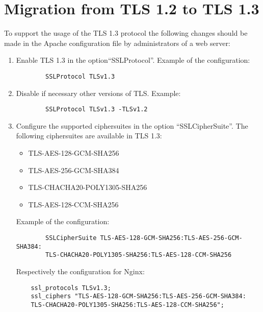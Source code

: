 \chapter{Migration from TLS 1.2 to TLS 1.3}
\label{chap:migration}

To support the usage of the TLS 1.3 protocol the following changes should be made in the Apache configuration file by administrators of a web server:\\
\begin{enumerate}
	\item Enable TLS 1.3 in the option“SSLProtocol”. Example of the configuration:
    \begin{verbatim}
        SSLProtocol TLSv1.3
    \end{verbatim}
    \item Disable if necessary other versions of TLS. Example: 
    \begin{verbatim}
        SSLProtocol TLSv1.3 -TLSv1.2
    \end{verbatim}
    \item Configure the supported ciphersuites in the option “SSLCipherSuite”. The following ciphersuites are available in TLS 1.3:
    \begin{itemize}
        \item TLS-AES-128-GCM-SHA256
        \item TLS-AES-256-GCM-SHA384
        \item TLS-CHACHA20-POLY1305-SHA256
        \item TLS-AES-128-CCM-SHA256
    \end{itemize}
    Example of the configuration:
    \begin{verbatim}
        SSLCipherSuite TLS-AES-128-GCM-SHA256:TLS-AES-256-GCM-SHA384:
        TLS-CHACHA20-POLY1305-SHA256:TLS-AES-128-CCM-SHA256
    \end{verbatim}
    Respectively the configuration for Nginx:
    \begin{verbatim}
    ssl_protocols TLSv1.3;
    ssl_ciphers "TLS-AES-128-GCM-SHA256:TLS-AES-256-GCM-SHA384:
    TLS-CHACHA20-POLY1305-SHA256:TLS-AES-128-CCM-SHA256";
    \end{verbatim}

\end{enumerate}


